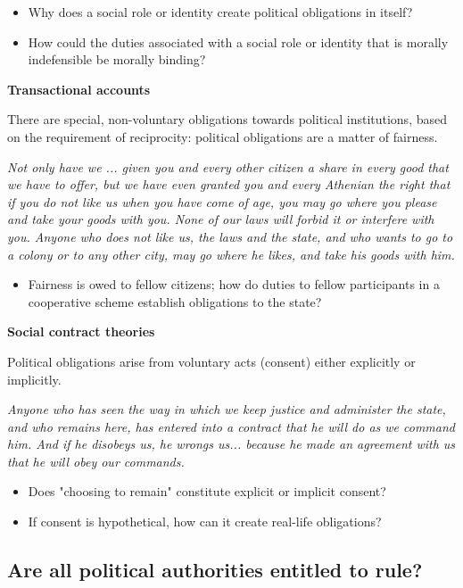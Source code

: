 \begin{itemize}
    \item Why does a social role or identity create political obligations
    in itself?
    \item How could the duties associated with a social role or identity that 
    is morally indefensible be morally binding?
\end{itemize}

\textbf{Transactional accounts}

There are special, non-voluntary obligations towards political institutions,
based on the requirement of reciprocity: political obligations are a matter
of fairness.

\textit{Not only have we ... given you and every other citizen a share in
every good that we have to offer, but we have even granted you and every
Athenian the right that if you do not like us when you have come of age, you
may go where you please and take your goods with you. None of our laws will
forbid it or interfere with you. Anyone who does not like us, the laws and
the state, and who wants to go to a colony or to any other city, may go where
he likes, and take his goods with him.}

\begin{itemize}
    \item Fairness is owed to fellow citizens; how do duties to fellow
    participants in a cooperative scheme establish obligations to the state?
\end{itemize}

\textbf{Social contract theories}

Political obligations arise from voluntary acts (consent) either explicitly
or implicitly.

\textit{Anyone who has seen the way in which we keep justice and administer
the state, and who remains here, has entered into a contract that he will
do as we command him. And if he disobeys us, he wrongs us... because he made
an agreement with us that he will obey our commands.}

\begin{itemize}
    \item Does "choosing to remain" constitute explicit or implicit consent?
    \item If consent is hypothetical, how can it create real-life obligations?
\end{itemize}

\subsection{Are all political authorities entitled to rule?}

